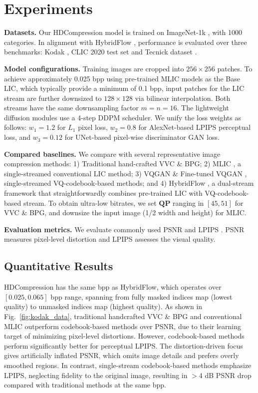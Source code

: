 \section{Experiments}
\label{sec:exp}

\noindent \textbf{Datasets.} Our HDCompression model is trained on ImageNet-1k \cite{imagenet}, with 1000 categories. In alignment with HybridFlow \cite{lu2024hybridflow}, performance is evaluated over three benchmarks: Kodak \cite{kodak}, CLIC 2020 test set \cite{CLIC2020} and Tecnick dataset \cite{tecknick}. 

\noindent \textbf{Model configurations.}
Training images are cropped into $256\!\times\!256$ patches. To achieve approximately 0.025 bpp using pre-trained MLIC models \cite{mlic2023} as the Base LIC, which typically provide a minimum of 0.1 bpp, input patches for the LIC stream are further downsized to $128 \times 128$ via bilinear interpolation. Both streams have the same downsampling factor $m = n = 16$. The lightweight diffusion modules use a 4-step DDPM scheduler. We unify the loss weights as follows: $w_{1} = 1.2$ for $L_{1}$ pixel loss, $w_{2} = 0.8$ for AlexNet-based LPIPS perceptual loss, and $w_{3} = 0.12$ for UNet-based pixel-wise discriminator GAN loss. 

\noindent \textbf{Compared baselines.} 
We compare with several representative image compression methods: 1) Traditional hand-crafted VVC \& BPG; 2) MLIC \cite{mlic2023}, a single-streamed conventional LIC method; 3) VQGAN \cite{esser2021taming} \& Fine-tuned VQGAN \cite{VQPeking}, single-streamed VQ-codebook-based methods; and 4) HybridFlow \cite{lu2024hybridflow}, a dual-stream framework that straightforwardly combines pre-trained LIC with VQ-codebook-based stream. To obtain ultra-low bitrates, we set $\textbf{QP}$ ranging in $[45,51]$ for VVC \& BPG, and downsize the input image (1/2 width and height) for MLIC.

\noindent \textbf{Evaluation metrics.} 
We evaluate commonly used PSNR and LPIPS \cite{LPIPS}. PSNR measures pixel-level distortion and LPIPS assesses the visual quality. 

\subsection{Quantitative Results}
HDCompression has the same bpp as HybridFlow, which operates over $[0.025, 0.065]$ bpp range, spanning from fully masked indices map (lowest quality) to unmasked indices map (highest quality). As shown in Fig.~\ref{fig:kodak_data}, traditional handcrafted VVC \& BPG and conventional MLIC outperform codebook-based methods over PSNR, due to their learning target of minimizing pixel-level distortions. However, codebook-based methods perform significantly better for perceptual LPIPS. The distortion-driven focus gives artificially inflated PSNR, which omits image details and prefers overly smoothed regions. In contrast, single-stream codebook-based methods emphasize LPIPS, neglecting fidelity to the original image, resulting in $>$4 dB PSNR drop compared with traditional methods at the same bpp.

